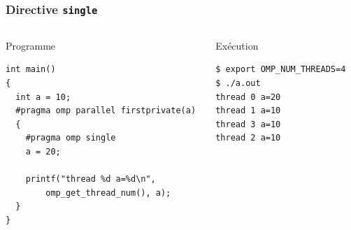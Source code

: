 \documentclass{beamer}
\begin{document}
\begin{frame}[fragile]
  \frametitle{Directive {\tt single}}

\begin{columns}[t]
  \column{6cm}
  \begin{block}{Programme}
\begin{verbatim}
int main()
{
  int a = 10; 
  #pragma omp parallel firstprivate(a) 
  {
    #pragma omp single
    a = 20;
   
    printf("thread %d a=%d\n",
        omp_get_thread_num(), a);
  }
}
\end{verbatim}
\end{block}
  
  \column{4.5cm}
  
  \begin{block}{Exécution}
\footnotesize
\begin{verbatim}
$ export OMP_NUM_THREADS=4
$ ./a.out 
thread 0 a=20
thread 1 a=10
thread 3 a=10
thread 2 a=10
\end{verbatim} 
  \end{block}  
\end{columns}
\normalsize

  
\end{frame}



   
  
  
  
\end{document}
